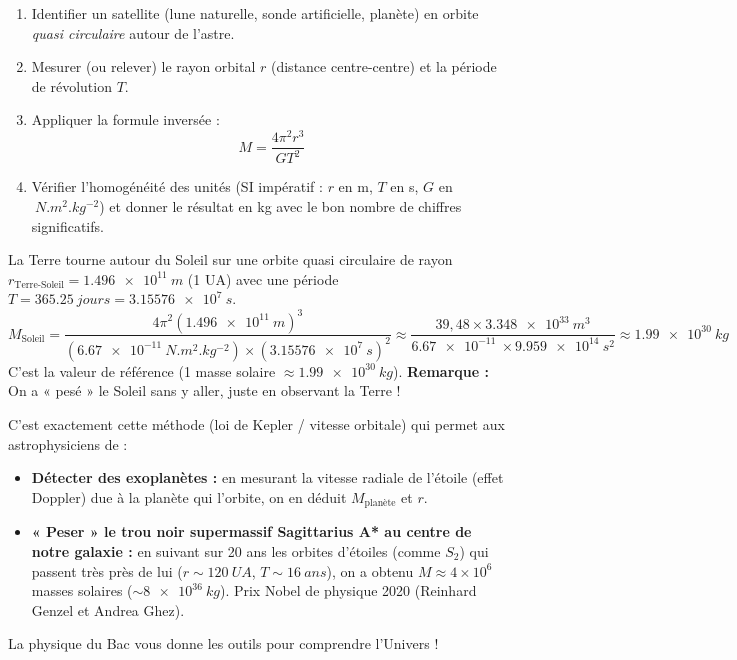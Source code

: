 \documentclass[11pt]{article}
\begin{document}
\begin{methode}
\begin{enumerate}
    \item Identifier un satellite (lune naturelle, sonde artificielle, planète) en orbite \emph{quasi circulaire} autour de l'astre.
    \item Mesurer (ou relever) le rayon orbital $r$ (distance centre-centre) et la période de révolution $T$.
    \item Appliquer la formule inversée :
    \[
    M = \frac{4\pi^2 r^3}{G T^2}
    \]
    \item Vérifier l'homogénéité des unités (SI impératif : $r$ en m, $T$ en s, $G$ en $\SI{}{N.m^2.kg^{-2}}$) et donner le résultat en kg avec le bon nombre de chiffres significatifs.
\end{enumerate}
\end{methode}

\begin{exemplebox}
La Terre tourne autour du Soleil sur une orbite quasi circulaire de rayon $r_{\text{Terre-Soleil}} = \SI{1,496e11}{m}$ (1 UA) avec une période $T = \SI{365,25}{jours} = \SI{3,15576e7}{s}$.
\[
M_{\text{Soleil}} = \frac{4\pi^2 (\SI{1,496e11}{m})^3}{(\SI{6,67e-11}{N.m^2.kg^{-2}}) \times (\SI{3,15576e7}{s})^2}
\approx \frac{39,48 \times \SI{3,348e33}{m^3}}{\SI{6,67e-11}{} \times \SI{9,959e14}{s^2}}
\approx \SI{1,99e30}{kg}
\]
C'est la valeur de référence (1 masse solaire $\approx \SI{1,99e30}{kg}$). \textbf{Remarque :} On a « pesé » le Soleil sans y aller, juste en observant la Terre !
\end{exemplebox}

\begin{savaistu}
C'est exactement cette méthode (loi de Kepler / vitesse orbitale) qui permet aux astrophysiciens de :
\begin{itemize}
    \item \textbf{Détecter des exoplanètes :} en mesurant la vitesse radiale de l'étoile (effet Doppler) due à la planète qui l'orbite, on en déduit $M_{\text{planète}}$ et $r$.
    \item \textbf{« Peser » le trou noir supermassif Sagittarius A* au centre de notre galaxie :} en suivant sur 20 ans les orbites d'étoiles (comme $S_2$) qui passent très près de lui ($r \sim \SI{120}{UA}$, $T \sim \SI{16}{ans}$), on a obtenu $M \approx 4 \times 10^6$ masses solaires (${\sim}\SI{8e36}{kg}$). Prix Nobel de physique 2020 (Reinhard Genzel et Andrea Ghez).
\end{itemize}
La physique du Bac vous donne les outils pour comprendre l'Univers !
\end{savaistu}
\end{document}

